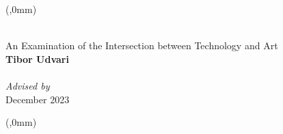 \documentclass[]{article}
\newlength{\spiralDiam}
\newlength{\foldOne}
\newlength{\foldTwo}
\newlength{\foldThree}
\newlength{\spineStart}
\begin{document}
\begin{textblock*}{\foldTwo}(\foldThree,0mm)
    \noindent

    \begin{adjustbox}{minipage=\dimexpr\foldTwo-40mm, margin=20mm}
      \centering
      \vspace*{20mm}
      {\Huge\textbf{\myShortTitle}}\\[1cm]
      
      {\large An Examination of the Intersection between Technology and Art}\\[2cm]
      
      {\Large\textbf{Tibor Udvari}}\\[0.5cm]
      
      {\large\textit{\myInstitution}}\\[0.5cm]
      
      {\large\textit{Advised by \myAdvisorShort}}\\[3cm]
      
      {\large December 2023}
      
    \end{adjustbox}
  \end{textblock*}

  \begin{textblock*}{\spiralDiam}(\spineStart,0mm)
    \noindent
  \end{textblock*}




\end{document}
